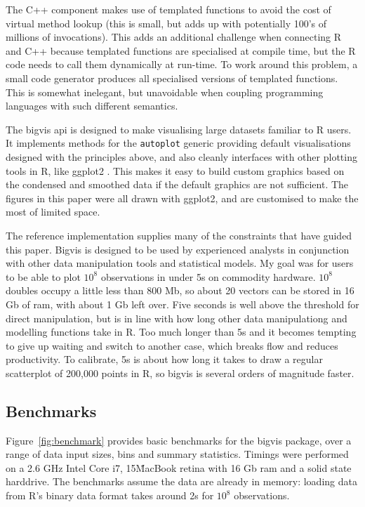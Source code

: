 \documentclass[journal]{vgtc}                %
\begin{document}
The C++ component makes use of templated functions to avoid the cost of virtual method lookup (this is small, but adds up with potentially 100's of millions of invocations). This adds an additional challenge when connecting R and C++ because templated functions are specialised at compile time, but the R code needs to call them dynamically at run-time. To work around this problem, a small code generator produces all specialised versions of templated functions. This is somewhat inelegant, but unavoidable when coupling programming languages with such different semantics.

The bigvis {\sc api} is designed to make visualising large datasets familiar to R users. It implements methods for the {\tt autoplot} generic providing default visualisations designed with the principles above, and also cleanly interfaces with other plotting tools in R, like ggplot2 \citep{me:ggplot2,wickham:2007d}. This makes it easy to build custom graphics based on the condensed and smoothed data if the default graphics are not sufficient. The figures in this paper were all drawn with ggplot2, and are customised to make the most of limited space.

The reference implementation supplies many of the constraints that have guided this paper. Bigvis is designed to be used by experienced analysts in conjunction with other data manipulation tools and statistical models. My goal was for users to be able to plot $10^8$ observations in under 5s on commodity hardware. $10^8$ doubles occupy a little less than 800 Mb, so about 20 vectors can be stored in 16 Gb of ram, with about 1 Gb left over. Five seconds is well above the threshold for direct manipulation, but is in line with how long other data manipulationg and modelling functions take in R. Too much longer than 5s and it becomes tempting to give up waiting and switch to another case, which breaks flow and reduces productivity. To calibrate, 5s is about how long it takes to draw a regular scatterplot of 200,000 points in R, so bigvis is several orders of magnitude faster.

\subsection{Benchmarks}
\label{sub:benchmarks}

Figure~\ref{fig:benchmark} provides basic benchmarks for the bigvis package, over a range of data input sizes, bins and summary statistics. Timings were performed on a 2.6 GHz Intel Core i7, 15\" MacBook retina with 16 Gb ram and a solid state harddrive. The benchmarks assume the data are already in memory: loading data from R's binary data format takes around 2s for $10^8$ observations.
\end{document}
